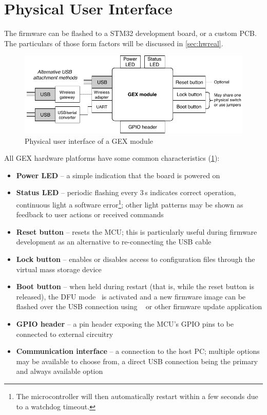 \section{Physical User Interface}

The firmware can be flashed to a STM32 development board, or a custom \gls{PCB}. The particulars of those form factors will be discussed in \cref{sec:hwreal}.

\begin{figure}[h]
	\centering
	\includegraphics[scale=.95] {img/users-view.pdf}
	\caption{\label{fig:users-view-of-gex}Physical user interface of a GEX module}
\end{figure}

\noindent
All GEX hardware platforms have some common characteristics (\cref{fig:users-view-of-gex}):

\begin{itemize}	
	\item \textbf{Power \gls{LED}} -- a simple indication that the board is powered on
	\item \textbf{Status \gls{LED}} -- periodic flashing every 3\,s indicates correct operation, continuous light a software error\footnote{The microcontroller will then automatically restart within a few seconds due to a watchdog timeout.}; other light patterns may be shown as feedback to user actions or received commands
	\item \textbf{Reset button} -- resets the \gls{MCU}; this is particularly useful during firmware development as an alternative to re-connecting the \gls{USB} cable
	\item \textbf{Lock button} -- enables or disables access to configuration files through the virtual mass storage device
	\item \textbf{Boot button} -- when held during restart (that is, while the reset button is released), the \gls{DFU} mode~\cite{usbif-dfu} is activated and a new firmware image can be flashed over the \gls{USB} connection using ~\cite{dfu-util} or other firmware update application
	\item \textbf{\gls{GPIO} header} -- a pin header exposing the \gls{MCU}'s \gls{GPIO} pins to be connected to external circuitry
	\item \textbf{Communication interface} -- a connection to the host \gls{PC}; multiple options may be available to choose from, a direct \gls{USB} connection being the primary and always available option
\end{itemize}

